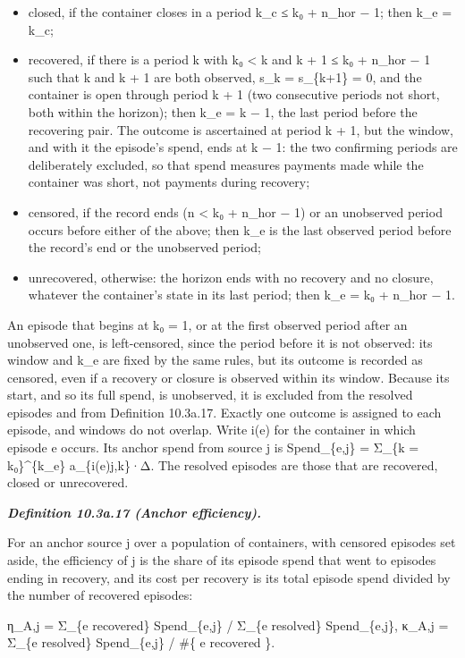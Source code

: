 \documentclass[
]{article}
\begin{document}
\begin{itemize}
\item
  closed, if the container closes in a period k\_c ≤ k₀ + n\_hor − 1;
  then k\_e = k\_c;
\item
  recovered, if there is a period k with k₀ \textless{} k and k + 1 ≤ k₀
  + n\_hor − 1 such that k and k + 1 are both observed, s\_k =
  s\_\{k+1\} = 0, and the container is open through period k + 1 (two
  consecutive periods not short, both within the horizon); then k\_e = k
  − 1, the last period before the recovering pair. The outcome is
  ascertained at period k + 1, but the window, and with it the episode's
  spend, ends at k − 1: the two confirming periods are deliberately
  excluded, so that spend measures payments made while the container was
  short, not payments during recovery;
\item
  censored, if the record ends (n \textless{} k₀ + n\_hor − 1) or an
  unobserved period occurs before either of the above; then k\_e is the
  last observed period before the record's end or the unobserved period;
\item
  unrecovered, otherwise: the horizon ends with no recovery and no
  closure, whatever the container's state in its last period; then k\_e
  = k₀ + n\_hor − 1.
\end{itemize}

An episode that begins at k₀ = 1, or at the first observed period after
an unobserved one, is left-censored, since the period before it is not
observed: its window and k\_e are fixed by the same rules, but its
outcome is recorded as censored, even if a recovery or closure is
observed within its window. Because its start, and so its full spend, is
unobserved, it is excluded from the resolved episodes and from
Definition 10.3a.17. Exactly one outcome is assigned to each episode,
and windows do not overlap. Write i(e) for the container in which
episode e occurs. Its anchor spend from source j is Spend\_\{e,j\} =
Σ\_\{k = k₀\}\^{}\{k\_e\} a\_\{i(e)j,k\}·Δ. The resolved episodes are
those that are recovered, closed or unrecovered.

\emph{\textbf{Definition 10.3a.17 (Anchor efficiency).}}

For an anchor source j over a population of containers, with censored
episodes set aside, the efficiency of j is the share of its episode
spend that went to episodes ending in recovery, and its cost per
recovery is its total episode spend divided by the number of recovered
episodes:

η\_A,j = Σ\_\{e recovered\} Spend\_\{e,j\} / Σ\_\{e resolved\}
Spend\_\{e,j\}, κ\_A,j = Σ\_\{e resolved\} Spend\_\{e,j\} / \#\{ e
recovered \}.
\end{document}
